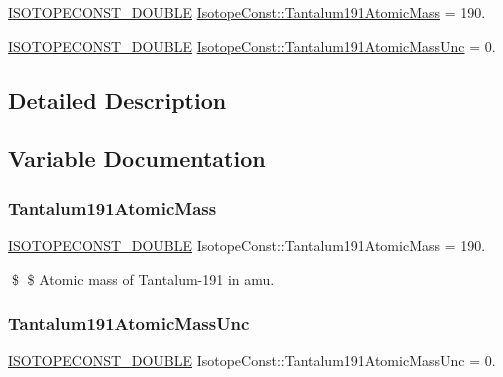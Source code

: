 \begin{DoxyCompactItemize}
\item 
\mbox{\hyperlink{group___isotope_const-_macros_ga8f45a7272ce02c0b4c65c44636ed719a}{I\+S\+O\+T\+O\+P\+E\+C\+O\+N\+S\+T\+\_\+\+D\+O\+U\+B\+LE}} \mbox{\hyperlink{group___isotope_const-_tantalum-_ta191_ga8734ff18c6863105490f0b24dd77b1c8}{Isotope\+Const\+::\+Tantalum191\+Atomic\+Mass}} = 190.
\item 
\mbox{\hyperlink{group___isotope_const-_macros_ga8f45a7272ce02c0b4c65c44636ed719a}{I\+S\+O\+T\+O\+P\+E\+C\+O\+N\+S\+T\+\_\+\+D\+O\+U\+B\+LE}} \mbox{\hyperlink{group___isotope_const-_tantalum-_ta191_gaa561c7b923325a1cc0c7b9374a113b28}{Isotope\+Const\+::\+Tantalum191\+Atomic\+Mass\+Unc}} = 0.
\end{DoxyCompactItemize}


\subsection{Detailed Description}


\subsection{Variable Documentation}
\mbox{\label{group___isotope_const-_tantalum-_ta191_ga8734ff18c6863105490f0b24dd77b1c8}} 
\subsubsection{\texorpdfstring{Tantalum191\+Atomic\+Mass}{Tantalum191AtomicMass}}
{\footnotesize\ttfamily \mbox{\hyperlink{group___isotope_const-_macros_ga8f45a7272ce02c0b4c65c44636ed719a}{I\+S\+O\+T\+O\+P\+E\+C\+O\+N\+S\+T\+\_\+\+D\+O\+U\+B\+LE}} Isotope\+Const\+::\+Tantalum191\+Atomic\+Mass = 190.}

\$ \$ Atomic mass of Tantalum-\/191 in amu. \mbox{\label{group___isotope_const-_tantalum-_ta191_gaa561c7b923325a1cc0c7b9374a113b28}} 
\subsubsection{\texorpdfstring{Tantalum191\+Atomic\+Mass\+Unc}{Tantalum191AtomicMassUnc}}
{\footnotesize\ttfamily \mbox{\hyperlink{group___isotope_const-_macros_ga8f45a7272ce02c0b4c65c44636ed719a}{I\+S\+O\+T\+O\+P\+E\+C\+O\+N\+S\+T\+\_\+\+D\+O\+U\+B\+LE}} Isotope\+Const\+::\+Tantalum191\+Atomic\+Mass\+Unc = 0.}

